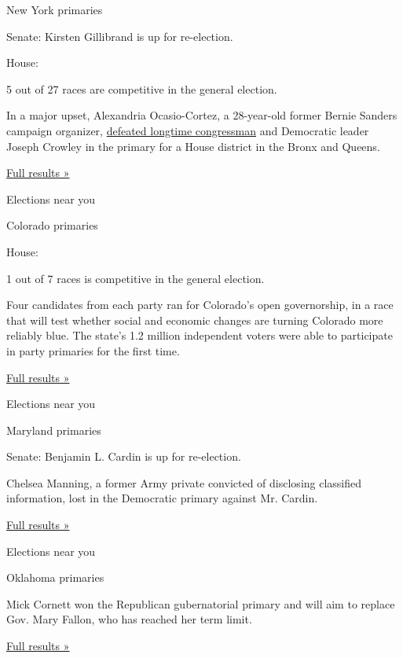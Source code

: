 New York primaries

Senate: Kirsten Gillibrand is up for re-election.

House:

5 out of 27 races are competitive in the general election.

In a major upset, Alexandria Ocasio-Cortez, a 28-year-old former Bernie
Sanders campaign organizer,
\href{https://www.nytimes3xbfgragh.onion/2018/06/27/nyregion/alexandria-ocasio-cortez-bio-profile.html}{defeated
longtime congressman} and Democratic leader Joseph Crowley in the
primary for a House district in the Bronx and Queens.

\href{https://www.nytimes3xbfgragh.onion/interactive/2018/06/26/us/elections/results-new-york-primary-elections.html}{Full
results »}

Elections near you

Colorado primaries

House:

1 out of 7 races is competitive in the general election.

Four candidates from each party ran for Colorado's open governorship, in
a race that will test whether social and economic changes are turning
Colorado more reliably blue. The state's 1.2 million independent voters
were able to participate in party primaries for the first time.

\href{https://www.nytimes3xbfgragh.onion/interactive/2018/06/26/us/elections/results-colorado-primary-elections.html}{Full
results »}

Elections near you

Maryland primaries

Senate: Benjamin L. Cardin is up for re-election.

Chelsea Manning, a former Army private convicted of disclosing
classified information, lost in the Democratic primary against Mr.
Cardin.

\href{https://www.nytimes3xbfgragh.onion/interactive/2018/06/26/us/elections/results-maryland-primary-elections.html}{Full
results »}

Elections near you

Oklahoma primaries

Mick Cornett won the Republican gubernatorial primary and will aim to
replace Gov. Mary Fallon, who has reached her term limit.

\href{https://www.nytimes3xbfgragh.onion/interactive/2018/06/26/us/elections/results-oklahoma-primary-elections.html}{Full
results »}

